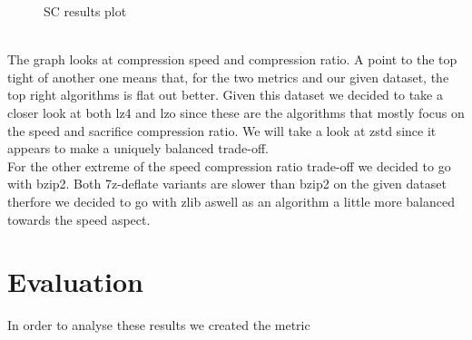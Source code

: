 \documentclass[
	12pt,
	a4paper,
	BCOR10mm,
	DIV14,
	listof=totoc,
	bibliography=totoc,
	headsepline
]{scrreprt}
\begin{document}
\begin{figure}[h]
\begin{center}
	\scalebox{0.75}{}
\end{center}
\caption{SC results plot}
\label{fig:sc_res}
\end{figure}

\quad \\

The graph looks at compression speed and compression ratio. A point to the top tight of another one means that, for the two metrics and our given dataset, the top right algorithms is flat out better. Given this dataset we decided to take a closer look at both lz4 and lzo since these are the algorithms that mostly focus on the speed and sacrifice compression ratio. We will take a look at zstd since it appears to make a uniquely balanced trade-off. \\
For the other extreme of the speed compression ratio trade-off we decided to go with bzip2. Both 7z-deflate variants are slower than bzip2 on the given dataset therfore we decided to go with zlib aswell as an algorithm a little more balanced towards the speed aspect.
\begin{table}
\begin{center}
\caption{SC results table, bold algorithms to be tested further}
\label{tab:sc_res}
\end{center}
\end{table}

\section{Evaluation}
In order to analyse these results we created the metric
\end{document}
